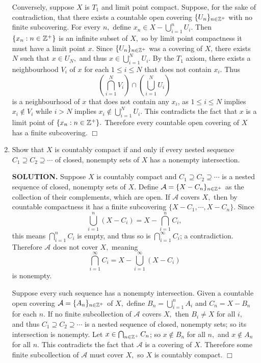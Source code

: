 \documentclass{article}
\begin{document}
\begin{enumerate}
    Conversely, suppose $X$ is $T_1$ and limit point compact. Suppose, for the sake of contradiction, that there exists a countable open covering $\{U_n\}_{n \in \mathbb{Z}^+}$ with no finite subcovering. For every $n,$ define $x_n \in X - \bigcup_{i=1}^n U_i.$ Then $\{x_n: n \in \mathbb{Z}^+\}$ is an infinite subset of $X,$ so by limit point compactness it must have a limit point $x.$ Since $\{U_n\}_{n \in \mathbb{Z}^+}$ was a covering of $X$, there exists $N$ such that $x \in U_N,$ and thus $x \in \bigcup_{i=1}^N U_i.$ By the $T_1$ axiom, there exists a neighbourhood $V_i$ of $x$ for each $1 \leq i \leq N$ that does not contain $x_i.$ Thus
    $$\left( \bigcap_{i=1}^N V_i \right) \cap \left( \bigcup_{i=1}^N U_i\right)$$
    is a neighbourhood of $x$ that does not contain any $x_i$, as $1\leq i \leq N$ implies $x_i \notin V_i$ while $i > N$ implies $x_i \notin \bigcup_{i=1}^N U_i$. This contradicts the fact that $x$ is a limit point of $\{x_n: n \in \mathbb{Z}^+\}.$ Therefore every countable open covering of $X$ has a finite subcovering. $\Box$

    \item Show that $X$ is countably compact if and only if every nested sequence $C_1 \supseteq C_2 \supseteq \cdots$ of closed, nonempty sets of $X$ has a nonempty intersection.

    {\bf SOLUTION.} Suppose $X$ is countably compact and $C_1 \supseteq C_2 \supseteq \cdots$ is a nested sequence of closed, nonempty sets of $X.$ Define $\mathcal{A} = \{X-C_n\}_{n \in \mathbb{Z}^+}$ as the collection of their complements, which are open. If $\mathcal{A}$ covers $X,$ then by countable compactness it has a finite subcovering $\{X-C_1, \cdots, X-C_n\}.$ Since
    $$\bigcup_{i=1}^n (X-C_i) = X- \bigcap_{i=1}^n C_i,$$
    this means $\bigcap_{i=1}^n C_i$ is empty, and thus so is $\bigcap_{i=1}^\infty C_i$; a contradiction. Therefore $\mathcal{A}$ does not cover $X,$ meaning 
    $$\bigcap_{i=1}^\infty C_i = X-\bigcup_{i=1}^\infty (X-C_i)$$
    is nonempty.

    Suppose every such sequence has a nonempty intersection. Given a countable open covering $\mathcal{A} = \{A_n\}_{n \in \mathbb{Z}^+}$ of $X,$ define $B_n = \bigcup_{i=1}^n A_i$ and $C_n = X-B_n$ for each $n.$ If no finite subcollection of $\mathcal{A}$ covers $X,$ then $B_i \neq X$ for all $i,$ and thus $C_1 \supseteq C_2 \supseteq \cdots$ is a nested sequence of closed, nonempty sets; so its intersection is nonempty. Let $x\in \bigcap_{n \in \mathbb{Z}^+} C_n$; so $x \notin B_n$ for all $n,$ and $x \notin A_n$ for all $n.$ This contradicts the fact that $\mathcal{A}$ is a covering of $X.$ Therefore some finite subcollection of $\mathcal{A}$ must cover $X,$ so $X$ is countably compact. $\Box$


\end{enumerate}
\end{document}
